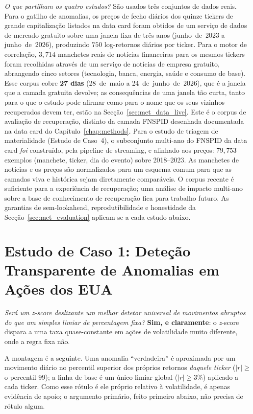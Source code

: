 \emph{O que partilham os quatro estudos?} São usados três conjuntos de dados reais. Para o gatilho de
anomalias, os preços de fecho diários dos quinze tickers de grande capitalização listados na data card foram
obtidos de um serviço de dados de mercado gratuito sobre uma janela fixa de três anos (junho~de~2023 a
junho~de~2026), produzindo $750$ log-retornos diários por ticker. Para o motor de correlação, $3{,}714$
manchetes reais de notícias financeiras para os mesmos tickers foram recolhidas através de um serviço de
notícias de empresa gratuito, abrangendo cinco setores (tecnologia, banca, energia, saúde e consumo de
base). Esse corpus cobre \textbf{27 dias} (28~de~maio a 24~de~junho~de~2026), que é a janela que a camada
gratuita devolve; as consequências de uma janela tão curta, tanto para o que o estudo pode afirmar como
para o nome que os seus vizinhos recuperados devem ter, estão na Secção~\ref{sec:met_data_live}. Este é o
corpus de avaliação de recuperação, distinto da camada FNSPID desenhada documentada na data card do
Capítulo~\ref{chap:methods}. Para o estudo de
triagem de materialidade (Estudo de Caso~4), o subconjunto multi-ano do FNSPID da data card \emph{foi}
construído, pela pipeline de streaming, e alinhado aos preços: $79{,}753$ exemplos (manchete, ticker, dia do
evento) sobre 2018--2023. As manchetes de notícias e os preços são normalizados para um esquema comum para
que as camadas viva e histórica sejam diretamente comparáveis. O corpus recente é suficiente para a
experiência de recuperação; uma análise de impacto multi-ano sobre a base de conhecimento de recuperação fica
para trabalho futuro. As garantias de sem-lookahead, reprodutibilidade e honestidade da
Secção~\ref{sec:met_evaluation} aplicam-se a cada estudo abaixo.

\section{Estudo de Caso 1: Deteção Transparente de Anomalias em Ações dos EUA}
\label{sec:cs_anomaly}

\emph{Será um \emph{z}-score deslizante um melhor detetor universal de movimentos abruptos do que um simples
limiar de percentagem fixa?} \textbf{Sim, e claramente}: o \emph{z}-score \autocite{chandola2009anomaly}
dispara a uma taxa quase-constante em ações de volatilidade muito diferente, onde a regra fixa não.

A montagem é a seguinte. Uma anomalia ``verdadeira'' é aproximada por um movimento diário no percentil
superior dos próprios retornos \emph{daquele ticker} ($|r|\ge$ o percentil $99$); a linha de base é um único
limiar global ($|r|\ge 3\%$) aplicado a cada ticker. Como esse rótulo é ele próprio relativo à volatilidade,
é apenas evidência de apoio; o argumento primário, feito primeiro abaixo, não precisa de rótulo algum.

